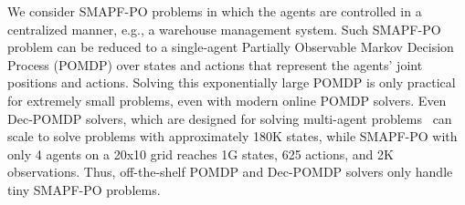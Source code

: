 \documentclass[letterpaper]{article} %
\begin{document}
We consider SMAPF-PO problems in which the agents are controlled in a centralized manner, e.g., a warehouse management system.
Such SMAPF-PO problem can be reduced to a single-agent Partially Observable Markov Decision Process (POMDP) over states and actions that represent the agents' joint positions and actions. Solving this exponentially large POMDP is only practical for extremely small problems, even with modern online POMDP solvers. Even Dec-POMDP solvers, which are designed for solving multi-agent problems~\cite{amato2019modeling} can scale to solve problems with approximately 180K states, while SMAPF-PO with only 4 agents on a 20x10 grid reaches 1G states, 625 actions, and 2K observations.
Thus, off-the-shelf POMDP and Dec-POMDP solvers only handle tiny SMAPF-PO problems.



\end{document}
